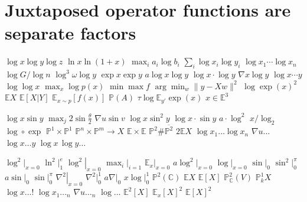 \documentclass{article}
\begin{document}
\section{Juxtaposed operator functions are separate factors}
$\log x\log y\log z$ $\ln x\ln(1+x)$ $\max_i a_i\log b_i$ $\sum_i\log x_i\log y_i$ $\log x_1\cdots\log x_n$
$\log G/\log n$ $\log^3\omega\log y$ $\exp x\exp y$ $a\log x\log y$ $\log x\cdot\log y$ $\nabla x\log y$
$\log x\cdots y$ $\log\log x$ $\max_x\log p(x)$ $\min\max f$ $\arg\min_w\|y-Xw\|^2$ $\log\exp(x)^2$
$\mathbb{E}X$ $\mathbb{E}[X|Y]$ $\mathbb{E}_{x\sim p}[f(x)]$ $\mathbb{P}(A)$ $\tau\log\mathbb{E}_{y'}\exp(x)$ $x\in\mathbb{E}^3$

$\log x\sin y$ $\max_j 2\sin\frac{\theta}{2}$ $\nabla u\sin v$ $\log x\sin^2 y$ $\log x\cdot\sin y$
$a\cdot\log^2$ $x/\log_2$ $\log\circ\exp$ $\mathbb{P}^1\times\mathbb{P}^1$ $\mathbb{P}^n\times\mathbb{P}^m\to X$
$\mathbb{E}\times\mathbb{E}$ $\mathbb{P}^2\#\overline{\mathbb{P}^2}$ $2\mathbb{E}X$
$\log x_1\ldots\log x_n$ $\nabla u\ldots$ $\log x\ldots y$ $\log x\,\log y\ldots$

$\log^2|_{x=0}$ $\ln^2|_1^e$ $\left.\log^2\right|_{x=0}$ $\max_i|_{i=1}$ $\mathbb{E}_x|_{x=0}$ $a\log^2|_{x=0}$ $\log|_{x=0}$
$\sin|_0$ $\sin^2|_0^\pi$ $a\sin|_0$ $\left.\sin\right|_0^\pi$ $\left.\nabla^2\right|_{x=0}$ $\nabla^2|^1_0$ $a\nabla|_0$ $x\log|_0^1$
$ℙ^{2}(\mathbb{C})$ $𝔼X$ $𝔼[X]$ $\mathbb{P}_{\mathbb{C}}^2(V)$ $\mathbb{P}_k^1 X$
$\log x\ldots!$ $\log x_{1}\ldots_{n}$ $\nabla u\ldots_{n}$ $\log\ldots$
$\mathbb{E}^2[X]$ $\mathbb{E}_x[X]^2$ $\mathbb{E}[X]^2$
\end{document}
